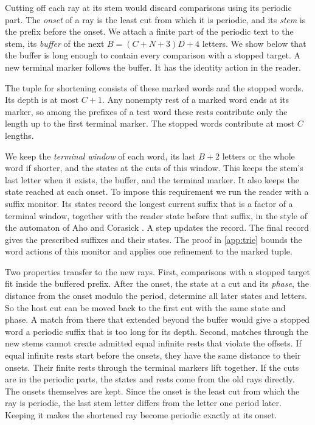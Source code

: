 Cutting off each ray at its stem would discard comparisons using its
periodic part. The \emph{onset} of a ray is the least cut from which it
is periodic, and its \emph{stem} is the prefix before the onset. We
attach a finite part of the periodic text to the stem, its \emph{buffer}
of the next $B=(C+N+3)D+4$ letters. We show below that the buffer is long
enough to contain every comparison with a stopped target. A new terminal
marker follows the buffer. It has the identity action in the reader.

The tuple for shortening consists of these marked words and the stopped
words. Its depth is at most $C+1$. Any nonempty rest of a marked word
ends at its marker, so among the prefixes of a test word these rests
contribute only the length up to the first terminal marker. The stopped
words contribute at most $C$ lengths.

We keep the \emph{terminal window} of each word, its last $B+2$ letters
or the whole word if shorter, and the states at the cuts of this window.
This keeps the stem's last letter when it exists, the buffer, and the
terminal marker. It also keeps the state reached at each onset. To impose
this requirement we run the reader with a suffix monitor. Its states
record the longest current suffix that is a factor of a terminal window,
together with the reader state before that suffix, in the style of the
automaton of Aho and Corasick \cite{AhoCorasick75}. A step updates the
record. The final record gives the prescribed suffixes and their states.
The proof in \cref{app:trie} bounds the word actions of this monitor
and applies one refinement to the marked tuple.



Two properties transfer to the new rays. First, comparisons with a
stopped target fit inside the buffered prefix. After the onset, the state
at a cut and its \emph{phase}, the distance from the onset modulo the
period, determine all later states and letters. So the host cut can be
moved back to the first cut with the same state and phase. A match from
there that extended beyond the buffer would give a stopped word a periodic
suffix that is too long for its depth. Second, matches through the new
stems cannot create admitted equal infinite rests that violate the
offsets. If equal infinite rests start before the onsets, they have the
same distance to their onsets. Their finite rests through the terminal
markers lift together. If the cuts are in the periodic parts, the states
and rests come from the old rays directly. The onsets themselves are
kept. Since the onset is the least cut from which the ray is periodic,
the last stem letter differs from the letter one period later. Keeping it
makes the shortened ray become periodic exactly at its onset.

